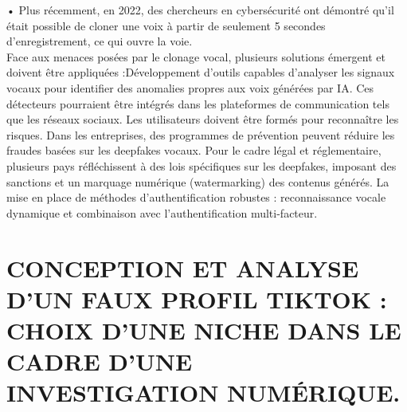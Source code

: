 \documentclass[]{article}
\begin{document}
•	Plus récemment, en 2022, des chercheurs en cybersécurité ont démontré qu’il était possible de cloner une voix à partir de seulement 5 secondes d’enregistrement, ce qui ouvre la voie.\\
Face aux menaces posées par le clonage vocal, plusieurs solutions émergent et doivent être
appliquées :Développement d’outils capables d’analyser les signaux vocaux pour identifier des anomalies propres aux voix générées par IA. Ces détecteurs pourraient être intégrés dans les plateformes de communication tels que les réseaux sociaux. Les utilisateurs doivent être formés pour reconnaître les risques. Dans les entreprises, des programmes de prévention peuvent réduire les fraudes basées sur les deepfakes vocaux. Pour le cadre légal et réglementaire, plusieurs pays réfléchissent à des lois spécifiques sur les deepfakes, imposant des sanctions et un marquage numérique (watermarking) des contenus générés. La mise en place de méthodes d’authentification robustes : reconnaissance vocale dynamique et combinaison avec l’authentification multi-facteur.

\section{CONCEPTION ET ANALYSE D’UN FAUX PROFIL TIKTOK : CHOIX D’UNE NICHE DANS LE CADRE D’UNE INVESTIGATION NUMÉRIQUE.}
\end{document}
